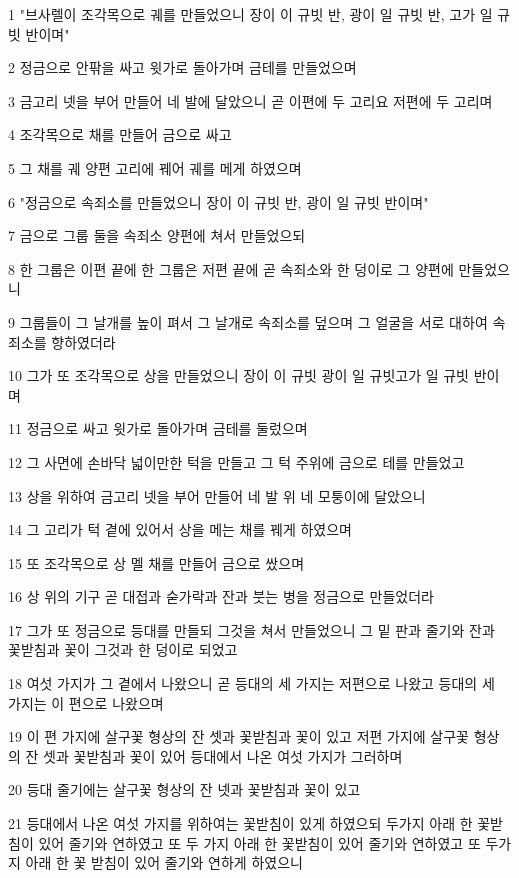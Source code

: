 \par 1 "브사렐이 조각목으로 궤를 만들었으니 장이 이 규빗 반, 광이 일 규빗 반, 고가 일 규빗 반이며"
\par 2 정금으로 안팎을 싸고 윗가로 돌아가며 금테를 만들었으며
\par 3 금고리 넷을 부어 만들어 네 발에 달았으니 곧 이편에 두 고리요 저편에 두 고리며
\par 4 조각목으로 채를 만들어 금으로 싸고
\par 5 그 채를 궤 양편 고리에 꿰어 궤를 메게 하였으며
\par 6 "정금으로 속죄소를 만들었으니 장이 이 규빗 반, 광이 일 규빗 반이며"
\par 7 금으로 그룹 둘을 속죄소 양편에 쳐서 만들었으되
\par 8 한 그룹은 이편 끝에 한 그룹은 저편 끝에 곧 속죄소와 한 덩이로 그 양편에 만들었으니
\par 9 그룹들이 그 날개를 높이 펴서 그 날개로 속죄소를 덮으며 그 얼굴을 서로 대하여 속죄소를 향하였더라
\par 10 그가 또 조각목으로 상을 만들었으니 장이 이 규빗 광이 일 규빗고가 일 규빗 반이며
\par 11 정금으로 싸고 윗가로 돌아가며 금테를 둘렀으며
\par 12 그 사면에 손바닥 넓이만한 턱을 만들고 그 턱 주위에 금으로 테를 만들었고
\par 13 상을 위하여 금고리 넷을 부어 만들어 네 발 위 네 모퉁이에 달았으니
\par 14 그 고리가 턱 곁에 있어서 상을 메는 채를 꿰게 하였으며
\par 15 또 조각목으로 상 멜 채를 만들어 금으로 쌌으며
\par 16 상 위의 기구 곧 대접과 숟가락과 잔과 붓는 병을 정금으로 만들었더라
\par 17 그가 또 정금으로 등대를 만들되 그것을 쳐서 만들었으니 그 밑 판과 줄기와 잔과 꽃받침과 꽃이 그것과 한 덩이로 되었고
\par 18 여섯 가지가 그 곁에서 나왔으니 곧 등대의 세 가지는 저편으로 나왔고 등대의 세 가지는 이 편으로 나왔으며
\par 19 이 편 가지에 살구꽃 형상의 잔 셋과 꽃받침과 꽃이 있고 저편 가지에 살구꽃 형상의 잔 셋과 꽃받침과 꽃이 있어 등대에서 나온 여섯 가지가 그러하며
\par 20 등대 줄기에는 살구꽃 형상의 잔 넷과 꽃받침과 꽃이 있고
\par 21 등대에서 나온 여섯 가지를 위하여는 꽃받침이 있게 하였으되 두가지 아래 한 꽃받침이 있어 줄기와 연하였고 또 두 가지 아래 한 꽃받침이 있어 줄기와 연하였고 또 두가지 아래 한 꽃 받침이 있어 줄기와 연하게 하였으니
